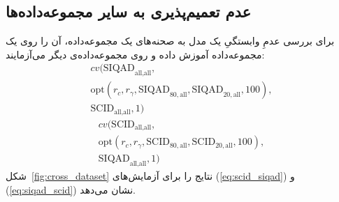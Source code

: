 \documentclass[twocolumn]{article}
\begin{document}
\subsection{عدم تعمیم‌پذیری به سایر مجموعه‌داده‌ها} \label{sec:gen_cross}
برای بررسی عدمِ وابستگیِ یک مدل به صحنه‌های یک مجموعه‌داده، آن را روی یک مجموعه‌داده آموزش داده و روی مجموعه‌داده‌ی دیگر می‌آزمایند: 
\begin{equation} 
	\begin{aligned} 
		\displaystyle cv(\text{SIQAD}_{\text{all}, \text{all}}, \\
		\text{opt}(r_c, r_\gamma, \text{SIQAD}_{80, \text{all}}, \text{SIQAD}_{20, \text{all}}, 100),\\
		\text{SCID}_{\text{all}, \text{all}}, 1)
	\end{aligned}
	\label{eq:siqad_scid}
\end{equation}
\begin{equation} 
	\begin{aligned} 
		\displaystyle cv(\text{SCID}_{\text{all}, \text{all}}, \\
		\text{opt}(r_c, r_\gamma, \text{SCID}_{80, \text{all}}, \text{SCID}_{20, \text{all}}, 100),\\
		\text{SIQAD}_{\text{all}, \text{all}}, 1)
	\end{aligned}
	\label{eq:scid_siqad}
\end{equation}
شکل~\ref{fig:cross_dataset} نتایج را برای آزمایش‌های (\ref{eq:scid_siqad}) و (\ref{eq:siqad_scid}) نشان می‌دهد.
\end{document}
